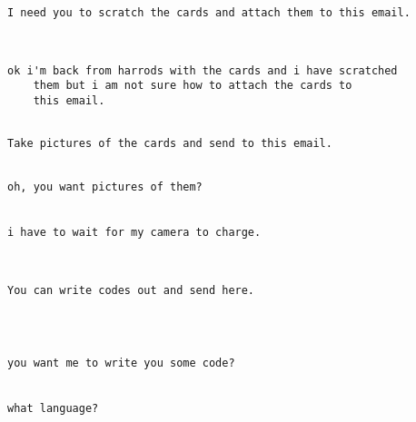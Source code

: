 \documentclass[xcolor=table]{beamer}
\begin{document}
\begin{frame}[fragile]
\begin{small}
	\begin{verbatim}
 
I need you to scratch the cards and attach them to this email.

	\end{verbatim}
\end{small}
\end{frame}
\begin{frame}[fragile]
\begin{small}
	\begin{verbatim}


ok i'm back from harrods with the cards and i have scratched
	them but i am not sure how to attach the cards to
	this email. 

	\end{verbatim}
\end{small}
\end{frame}
\begin{frame}[fragile]
\begin{small}
	\begin{verbatim}
 
Take pictures of the cards and send to this email.

	\end{verbatim}
\end{small}
\end{frame}
\begin{frame}[fragile]
\begin{small}
	\begin{verbatim}

oh, you want pictures of them? 


i have to wait for my camera to charge. 


	\end{verbatim}
\end{small}
\end{frame}
\begin{frame}[fragile]
\begin{small}
	\begin{verbatim}
 
You can write codes out and send here.


	\end{verbatim}
\end{small}
\end{frame}
\begin{frame}[fragile]
\begin{small}
	\begin{verbatim}


you want me to write you some code?


what language?

	\end{verbatim}
\end{small}
\end{frame}
\end{document}
